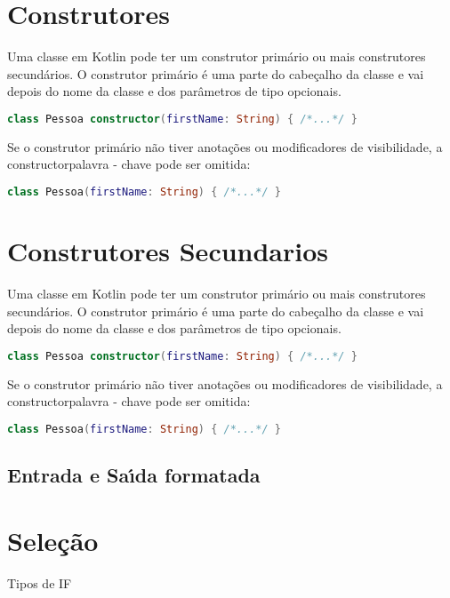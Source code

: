 \section{Construtores}
Uma classe em Kotlin pode ter um construtor primário ou mais
 construtores secundários. O construtor primário é uma parte do
  cabeçalho da classe e vai depois do nome da classe e dos parâmetros
   de tipo opcionais.
\begin{lstlisting}[label={lst:example1}, language=Kotlin]
  class Pessoa constructor(firstName: String) { /*...*/ }
      \end{lstlisting}

Se o construtor primário não tiver anotações ou modificadores 
de visibilidade, a constructorpalavra - chave pode ser omitida:
\begin{lstlisting}[label={lst:example1}, language=Kotlin]
  class Pessoa(firstName: String) { /*...*/ }
      \end{lstlisting}


\section{Construtores Secundarios}
Uma classe em Kotlin pode ter um construtor primário ou mais
 construtores secundários. O construtor primário é uma parte do
  cabeçalho da classe e vai depois do nome da classe e dos parâmetros
   de tipo opcionais.
\begin{lstlisting}[label={lst:example1}, language=Kotlin]
  class Pessoa constructor(firstName: String) { /*...*/ }
      \end{lstlisting}

Se o construtor primário não tiver anotações ou modificadores 
de visibilidade, a constructorpalavra - chave pode ser omitida:
\begin{lstlisting}[label={lst:example1}, language=Kotlin]
  class Pessoa(firstName: String) { /*...*/ }
      \end{lstlisting}

\subsection{Entrada e Sa\'{\i}da formatada}


\section{Sele\c{c}\~{a}o}
Tipos de IF

